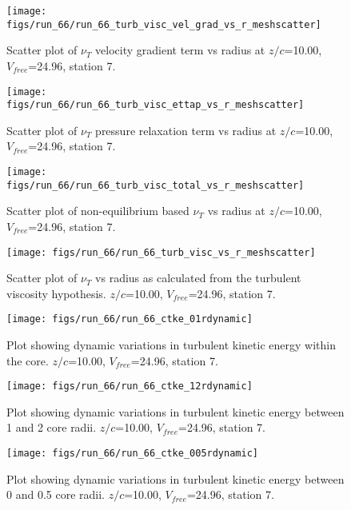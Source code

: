 \begin{figure}[H]
\centering
\texttt{[image: figs/run\_66/run\_66\_turb\_visc\_vel\_grad\_vs\_r\_meshscatter]}
\caption{Scatter plot of $\nu_T$ velocity gradient term vs radius at $z/c$=10.00, $V_{free}$=24.96, station 7.}
\end{figure}


\begin{figure}[H]
\centering
\texttt{[image: figs/run\_66/run\_66\_turb\_visc\_ettap\_vs\_r\_meshscatter]}
\caption{Scatter plot of $\nu_T$ pressure relaxation term vs radius at $z/c$=10.00, $V_{free}$=24.96, station 7.}
\end{figure}


\begin{figure}[H]
\centering
\texttt{[image: figs/run\_66/run\_66\_turb\_visc\_total\_vs\_r\_meshscatter]}
\caption{Scatter plot of non-equilibrium based $\nu_T$ vs radius at $z/c$=10.00, $V_{free}$=24.96, station 7.}
\end{figure}


\begin{figure}[H]
\centering
\texttt{[image: figs/run\_66/run\_66\_turb\_visc\_vs\_r\_meshscatter]}
\caption{Scatter plot of $\nu_T$ vs radius as calculated from the turbulent viscosity hypothesis. $z/c$=10.00, $V_{free}$=24.96, station 7.}
\end{figure}


\begin{figure}[H]
\centering
\texttt{[image: figs/run\_66/run\_66\_ctke\_01rdynamic]}
\caption{Plot showing dynamic variations in turbulent kinetic energy within the core. $z/c$=10.00, $V_{free}$=24.96, station 7.}
\end{figure}


\begin{figure}[H]
\centering
\texttt{[image: figs/run\_66/run\_66\_ctke\_12rdynamic]}
\caption{Plot showing dynamic variations in turbulent kinetic energy between 1 and 2 core radii. $z/c$=10.00, $V_{free}$=24.96, station 7.}
\end{figure}


\begin{figure}[H]
\centering
\texttt{[image: figs/run\_66/run\_66\_ctke\_005rdynamic]}
\caption{Plot showing dynamic variations in turbulent kinetic energy between 0 and 0.5 core radii. $z/c$=10.00, $V_{free}$=24.96, station 7.}
\end{figure}


